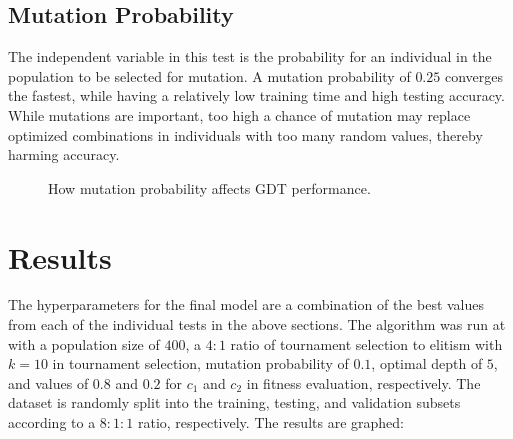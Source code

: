 \documentclass[12pt]{article}
\begin{document}
\subsection{Mutation Probability}

The independent variable in this test is the probability for an individual in the population to be selected for mutation. A mutation probability of $0.25$ converges the fastest, while having a relatively low training time and high testing accuracy. While mutations are important, too high a chance of mutation may replace optimized combinations in individuals with too many random values, thereby harming accuracy.

\begin{figure}[H]
    \centering
    \caption{How mutation probability affects GDT performance.}
\end{figure}

\section{Results}

The hyperparameters for the final model are a combination of the best values from each of the individual tests in the above sections. The algorithm was run at with a population size of $400$, a $4:1$ ratio of tournament selection to elitism with $k=10$ in tournament selection, mutation probability of $0.1$, optimal depth of $5$, and values of $0.8$ and $0.2$ for $c_1$ and $c_2$ in fitness evaluation, respectively. The dataset is randomly split into the training, testing, and validation subsets according to a $8:1:1$ ratio, respectively. The results are graphed:
\end{document}
